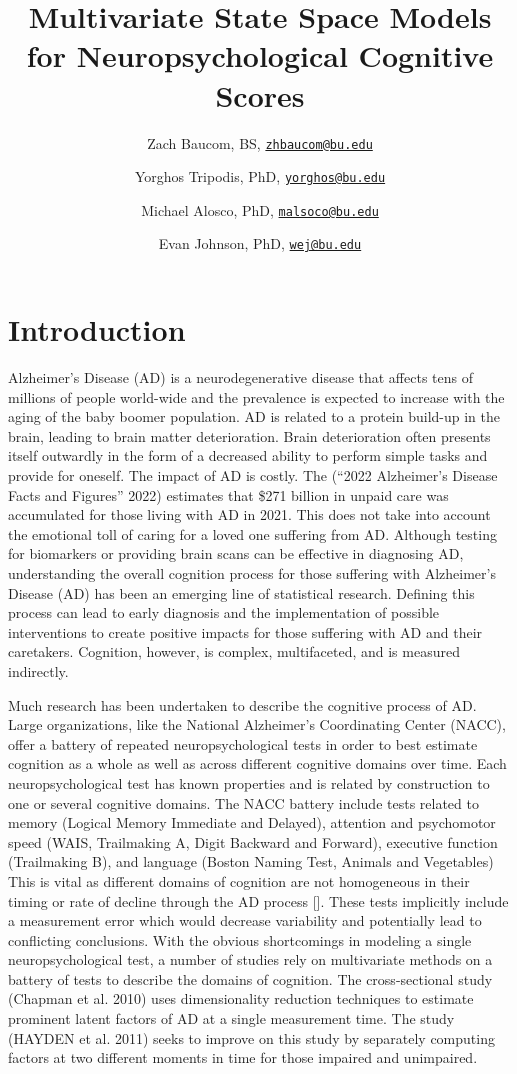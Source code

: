 \documentclass[
]{article}
\title{Multivariate State Space Models for Neuropsychological Cognitive Scores}
\author{Zach Baucom, BS, \href{mailto:zhbaucom@bu.edu}{\nolinkurl{zhbaucom@bu.edu}} \and Yorghos Tripodis, PhD, \href{mailto:yorghos@bu.edu}{\nolinkurl{yorghos@bu.edu}} \and Michael Alosco, PhD, \href{mailto:malsoco@bu.edu}{\nolinkurl{malsoco@bu.edu}} \and Evan Johnson, PhD, \href{mailto:wej@bu.edu}{\nolinkurl{wej@bu.edu}}}
\date{}
\begin{document}
\maketitle

{
\setcounter{tocdepth}{2}
\tableofcontents
}
\newpage{}

\hypertarget{introduction}{%
\section{Introduction}\label{introduction}}

Alzheimer's Disease (AD) is a neurodegenerative disease that affects tens of millions of people world-wide and the prevalence is expected to increase with the aging of the baby boomer population. AD is related to a protein build-up in the brain, leading to brain matter deterioration. Brain deterioration often presents itself outwardly in the form of a decreased ability to perform simple tasks and provide for oneself. The impact of AD is costly. The ({``2022 Alzheimer's Disease Facts and Figures''} 2022) estimates that \$271 billion in unpaid care was accumulated for those living with AD in 2021. This does not take into account the emotional toll of caring for a loved one suffering from AD. Although testing for biomarkers or providing brain scans can be effective in diagnosing AD, understanding the overall cognition process for those suffering with Alzheimer's Disease (AD) has been an emerging line of statistical research. Defining this process can lead to early diagnosis and the implementation of possible interventions to create positive impacts for those suffering with AD and their caretakers. Cognition, however, is complex, multifaceted, and is measured indirectly.

Much research has been undertaken to describe the cognitive process of AD. Large organizations, like the National Alzheimer's Coordinating Center (NACC), offer a battery of repeated neuropsychological tests in order to best estimate cognition as a whole as well as across different cognitive domains over time. Each neuropsychological test has known properties and is related by construction to one or several cognitive domains. The NACC battery include tests related to memory (Logical Memory Immediate and Delayed), attention and psychomotor speed (WAIS, Trailmaking A, Digit Backward and Forward), executive function (Trailmaking B), and language (Boston Naming Test, Animals and Vegetables) This is vital as different domains of cognition are not homogeneous in their timing or rate of decline through the AD process {[}{]}. These tests implicitly include a measurement error which would decrease variability and potentially lead to conflicting conclusions. With the obvious shortcomings in modeling a single neuropsychological test, a number of studies rely on multivariate methods on a battery of tests to describe the domains of cognition. The cross-sectional study (Chapman et al. 2010) uses dimensionality reduction techniques to estimate prominent latent factors of AD at a single measurement time. The study (HAYDEN et al. 2011) seeks to improve on this study by separately computing factors at two different moments in time for those impaired and unimpaired.
\end{document}
